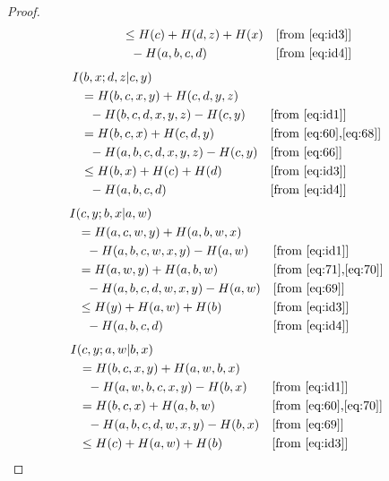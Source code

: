 \documentclass[10pt,journal]{IEEEtran}
\begin{document}
\begin{proof}
\begin{align}
             &\ \ \le H(c) + H(d,z) + H(x)         & & [\mbox{from \eqref{eq:id3}}] \notag\\
             &\ \ \ \  - H(a,b,c,d)                & & [\mbox{from \eqref{eq:id4}}]
\end{align}
%
\begin{align}
&   I(b,x;d,z|c,y) \notag\\
             &\ \ = H(b,c,x,y) + H(c,d,y,z)\notag\\
             &\ \ \ \  - H(b,c,d,x,y,z) - H(c,y)   & & [\mbox{from \eqref{eq:id1}}] \notag\\
             &\ \ = H(b,c,x) + H(c,d,y)            & & [\mbox{from \eqref{eq:60},\eqref{eq:68}}] \notag\\
             &\ \ \ \  - H(a,b,c,d,x,y,z) - H(c,y) & & [\mbox{from \eqref{eq:66}}] \notag\\
             &\ \ \le H(b,x) + H(c) + H(d)         & & [\mbox{from \eqref{eq:id3}}] \notag\\
             &\ \ \ \  - H(a,b,c,d)                & & [\mbox{from \eqref{eq:id4}}]
\end{align}
%
\begin{align}
&   I(c,y;b,x|a,w) \notag\\
             &\ \ = H(a,c,w,y) + H(a,b,w,x)\notag\\
             &\ \ \ \  - H(a,b,c,w,x,y) - H(a,w)   & & [\mbox{from \eqref{eq:id1}}] \notag\\
             &\ \ = H(a,w,y) + H(a,b,w)            & & [\mbox{from \eqref{eq:71},\eqref{eq:70}}] \notag\\
             &\ \ \ \  - H(a,b,c,d,w,x,y) - H(a,w) & & [\mbox{from \eqref{eq:69}}] \notag\\
             &\ \ \le H(y) + H(a,w) + H(b)         & & [\mbox{from \eqref{eq:id3}}] \notag\\
             &\ \ \ \  - H(a,b,c,d)                & & [\mbox{from \eqref{eq:id4}}]
\end{align}
%
\begin{align}
&   I(c,y;a,w|b,x) \notag\\
             &\ \ = H(b,c,x,y) + H(a,w,b,x)\notag\\
             &\ \ \ \  - H(a,w,b,c,x,y) - H(b,x)   & \Comment{\eqref{eq:id1}} \notag\\
             &\ \ = H(b,c,x) + H(a,b,w)            & \Comment{\eqref{eq:60},\eqref{eq:70}}\notag\\
             &\ \ \ \  - H(a,b,c,d,w,x,y) - H(b,x) & \Comment{\eqref{eq:69}} \notag\\
             &\ \ \le H(c) + H(a,w) + H(b)         & \Comment{\eqref{eq:id3}} \notag\\

\end{align}
\end{proof}
\end{document}
